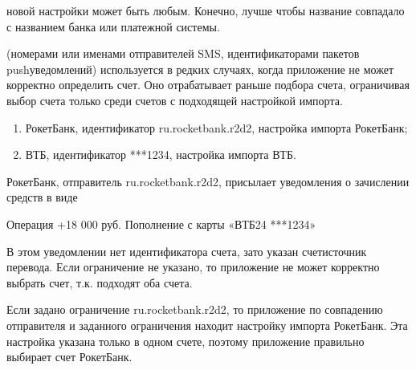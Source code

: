 \documentclass[a4paper,10pt,russian]{sphinxmanual}
\begin{document}
\noindent{}
\noindent{}
\noindent{}

\sphinxAtStartPar
{} новой настройки может быть любым. Конечно, лучше чтобы название совпадало с
названием банка или платежной системы.

\sphinxAtStartPar
{} (номерами или именами отправителей SMS, идентификаторами пакетов push\sphinxhyphen{}уведомлений)
используется в редких случаях, когда приложение не может корректно определить счет. Оно отрабатывает раньше
подбора счета, ограничивая выбор счета только среди счетов с подходящей настройкой импорта.
\begin{description}
\begin{enumerate}
%
\item {} 
\sphinxAtStartPar
РокетБанк, идентификатор ru.rocketbank.r2d2, настройка импорта РокетБанк;

\item {} 
\sphinxAtStartPar
ВТБ, идентификатор ***1234, настройка импорта ВТБ.

\end{enumerate}

\end{description}

\sphinxAtStartPar
РокетБанк, отправитель ru.rocketbank.r2d2, присылает уведомления о зачислении средств в виде

\begin{sphinxVerbatim}[commandchars=\\\{\}]
Операция \PYGZgt{}\PYGZgt{} +18 000 руб.
Пополнение с карты «ВТБ\PYGZhy{}24 ***1234»
\end{sphinxVerbatim}

\sphinxAtStartPar
В этом уведомлении нет идентификатора счета, зато указан счет\sphinxhyphen{}источник перевода. Если ограничение не указано,
то приложение не может корректно выбрать счет, т.к. подходят оба счета.

\sphinxAtStartPar
Если задано ограничение ru.rocketbank.r2d2, то приложение по совпадению отправителя и заданного ограничения
находит настройку импорта РокетБанк. Эта настройка указана только в одном счете, поэтому приложение правильно выбирает
счет РокетБанк.
\end{document}
